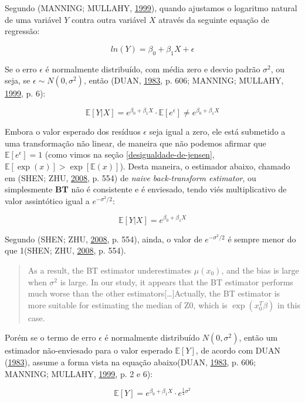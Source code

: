 \documentclass[a4paper, 12pt]{article}
\begin{document}
Segundo (MANNING; MULLAHY, \protect\hyperlink{ref-NBERt0246}{1999}),
quando ajustamos o logaritmo natural de uma variável \(Y\) contra outra
variável \(X\) através da seguinte equação de regressão:

\[ln(Y) = \beta_0 + \beta_1X + \epsilon\]

Se o erro \(\epsilon\) é normalmente distribuído, com média zero e
desvio padrão \(\sigma^2\), ou seja, se
\(\epsilon \sim N(0, \sigma^2)\), então (DUAN,
\protect\hyperlink{ref-Duan}{1983}, p. 606; MANNING; MULLAHY,
\protect\hyperlink{ref-NBERt0246}{1999}, p. 6):

\[\mathbb{E}[Y|X] = e^{\beta_0 + \beta_1X} \cdot \mathbb{E}[e^\epsilon] \ne e^{\beta_0 + \beta_1X}\]

Embora o valor esperado dos resíduos \(\epsilon\) seja igual a zero, ele
está submetido a uma transformação não linear, de maneira que não
podemos afirmar que \(\mathbb{E}[e^\epsilon] = 1\) (como vimos na seção
\ref{desigualdade-de-jensen},
\(\mathbb{E}[\exp(x)] > \exp[\mathbb{E}(x)]\)). Desta maneira, o
estimador abaixo, chamado em (SHEN; ZHU,
\protect\hyperlink{ref-shen}{2008}, p. 554) de \emph{naive
back-transform estimator}, ou simplesmente \textbf{BT} não é consistente
e é enviesado, tendo viés multiplicativo de valor assintótico igual a
\(e^{-\sigma^2/2}\):

\[\mathbb{E}[Y|X] = e^{\beta_0 + \beta_1X}\]

Segundo (SHEN; ZHU, \protect\hyperlink{ref-shen}{2008}, p. 554), ainda,
o valor de \(e^{-\sigma^2/2}\) é sempre menor do que 1(SHEN; ZHU,
\protect\hyperlink{ref-shen}{2008}, p. 554).

\begin{quote}
As a result, the BT estimator underestimates \(\mu(x_0)\), and the bias
is large when \(\sigma^2\) is large. In our study, it appears that the
BT estimator performs much worse than the other
estimators{[}\ldots{}{]}Actually, the BT estimator is more suitable for
estimating the median of Z0, which is \(\exp(x_0^T\beta)\) in this case.
\end{quote}

Porém se o termo de erro \(\epsilon\) é normalmente distribuído
\(N(0,\sigma^2)\), então um estimador não-enviesado para o valor
esperado \(\mathbb{E}[Y]\), de acordo com DUAN
(\protect\hyperlink{ref-Duan}{1983}), assume a forma vista na equação
abaixo(DUAN, \protect\hyperlink{ref-Duan}{1983}, p. 606; MANNING;
MULLAHY, \protect\hyperlink{ref-NBERt0246}{1999}, p. 2 e 6):

\[\mathbb{E}[Y] = e^{\beta_0 + \beta_1X} \cdot e^{\frac{1}{2}\sigma^2}\]
\end{document}
